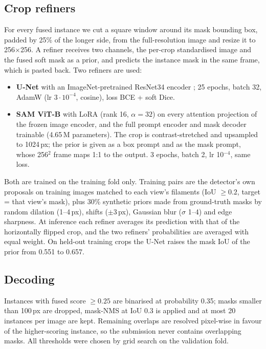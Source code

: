 \documentclass[sigconf]{acmart}
\begin{document}
\subsection{Crop refiners}
For every fused instance we cut a square window around its mask bounding box, padded by 25\% of the longer side, from the full-resolution image and resize it to 256$\times$256. A refiner receives two channels, the per-crop standardised image and the fused soft mask as a prior, and predicts the instance mask in the same frame, which is pasted back. Two refiners are used:
\begin{itemize}
  \item \textbf{U-Net} \cite{ronneberger2015unet} with an ImageNet-pretrained ResNet34 encoder \cite{he2016resnet, iakubovskii2019smp}; 25 epochs, batch 32, AdamW (lr $3\cdot10^{-4}$, cosine), loss BCE + soft Dice.
  \item \textbf{SAM ViT-B} \cite{kirillov2023sam} with LoRA \cite{hu2022lora} (rank 16, $\alpha=32$) on every attention projection of the frozen image encoder, and the full prompt encoder and mask decoder trainable (4.65\,M parameters). The crop is contrast-stretched and upsampled to 1024\,px; the prior is given as a box prompt and as the mask prompt, whose 256$^2$ frame maps 1:1 to the output. 3 epochs, batch 2, lr 10$^{-4}$, same loss.
\end{itemize}
Both are trained on the training fold only. Training pairs are the detector's own proposals on training images matched to each view's filaments (IoU $\ge 0.2$, target = that view's mask), plus 30\% synthetic priors made from ground-truth masks by random dilation (1--4\,px), shifts ($\pm$3\,px), Gaussian blur ($\sigma$ 1--4) and edge sharpness. At inference each refiner averages its prediction with that of the horizontally flipped crop, and the two refiners' probabilities are averaged with equal weight. On held-out training crops the U-Net raises the mask IoU of the prior from 0.551 to 0.657.

\subsection{Decoding}
Instances with fused score $\ge 0.25$ are binarised at probability 0.35; masks smaller than 100\,px are dropped, mask-NMS at IoU 0.3 is applied and at most 20 instances per image are kept. Remaining overlaps are resolved pixel-wise in favour of the higher-scoring instance, so the submission never contains overlapping masks. All thresholds were chosen by grid search on the validation fold.
\end{document}
